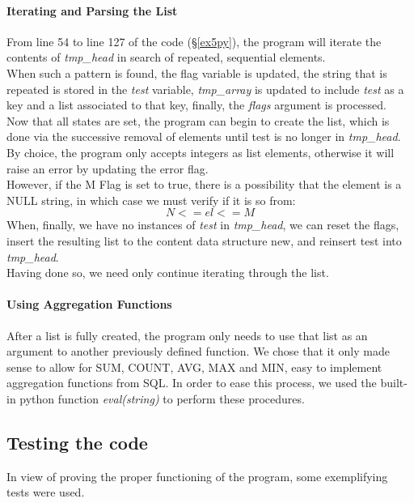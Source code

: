 \documentclass[11pt,a4paper,times]{report}
\begin{document}
\paragraph{Iterating and Parsing the List}
From line 54 to line 127 of the code (\S\ref{ex5py}), the program will iterate the
contents of \textit{tmp\_head} in search of repeated, sequential elements.\\
When such a pattern is found, the flag variable is updated, the string that is repeated
is stored in the \textit{test} variable, \textit{tmp\_array} is updated to include \textit{test} as a
key and a list associated to that key, finally, the \textit{flags} argument is processed.\\
Now that all states are set, the program can begin to create the list,
which is done via the successive removal of elements until test is no longer
in \textit{tmp\_head}. By choice, the program only accepts integers as list elements,
otherwise it will raise an error by updating the error flag.\\
However, if the M Flag is set to true, there is a possibility that the element
is a NULL string, in which case we must verify if it is so from:
$$N <= el <= M$$
When, finally, we have no instances of \textit{test} in \textit{tmp\_head}, we can reset the flags,
insert the resulting list to the content data structure new, and reinsert test
into \textit{tmp\_head}.\\
Having done so, we need only continue iterating through the list.
\paragraph{Using Aggregation Functions}
After a list is fully created, the program only needs to use that list as
an argument to another previously defined function. We chose that it only
made sense to allow for SUM, COUNT, AVG, MAX and MIN, easy to implement
aggregation functions from SQL. In order to ease this process, we used the
built-in python function \textit{eval(string)} to perform these procedures.
\subsection{Testing the code}
In view of proving the proper functioning of the program, some exemplifying tests were
used.
\end{document}
